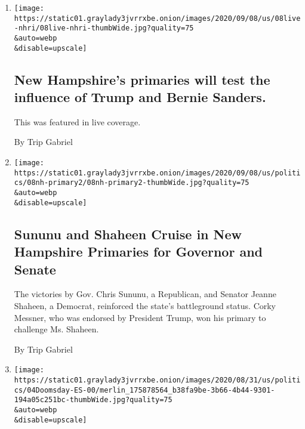 \begin{enumerate}
\def\labelenumi{\arabic{enumi}.}
\item
  \href{/live/2020/09/08/us/trump-vs-biden/new-hampshires-primaries-will-test-the-influence-of-trump-and-bernie-sanders}{}

  \texttt{[image: https://static01.graylady3jvrrxbe.onion/images/2020/09/08/us/08live-nhri/08live-nhri-thumbWide.jpg?quality=75\\\&auto=webp\\\&disable=upscale]}

  \hypertarget{new-hampshires-primaries-will-test-the-influence-of-trump-and-bernie-sanders}{%
  \subsection{New Hampshire's primaries will test the influence of Trump
  and Bernie
  Sanders.}\label{new-hampshires-primaries-will-test-the-influence-of-trump-and-bernie-sanders}}

  This was featured in live coverage.

  By Trip Gabriel
\item
  \href{/2020/09/08/us/politics/nh-primary.html}{}

  \texttt{[image: https://static01.graylady3jvrrxbe.onion/images/2020/09/08/us/politics/08nh-primary2/08nh-primary2-thumbWide.jpg?quality=75\\\&auto=webp\\\&disable=upscale]}

  \hypertarget{sununu-and-shaheen-cruise-in-new-hampshire-primaries-for-governor-and-senate}{%
  \subsection{Sununu and Shaheen Cruise in New Hampshire Primaries for
  Governor and
  Senate}\label{sununu-and-shaheen-cruise-in-new-hampshire-primaries-for-governor-and-senate}}

  The victories by Gov. Chris Sununu, a Republican, and Senator Jeanne
  Shaheen, a Democrat, reinforced the state's battleground status. Corky
  Messner, who was endorsed by President Trump, won his primary to
  challenge Ms. Shaheen.

  By Trip Gabriel
\item
  \href{/es/2020/09/04/espanol/estados-unidos/elecciones-estados-unidos.html}{}

  \texttt{[image: https://static01.graylady3jvrrxbe.onion/images/2020/08/31/us/politics/04Doomsday-ES-00/merlin\_175878564\_b38fa9be-3b66-4b44-9301-194a05c251bc-thumbWide.jpg?quality=75\\\&auto=webp\\\&disable=upscale]}


\end{enumerate}
